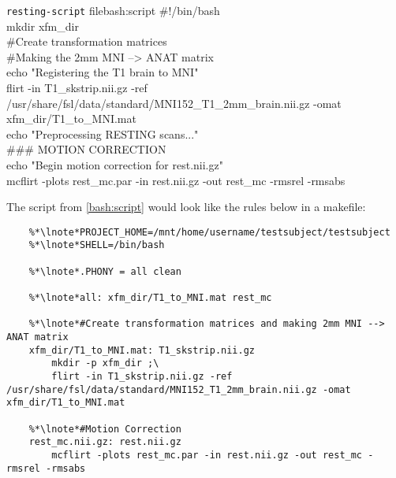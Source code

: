 \begin{bash}{\texttt{resting-script} file}{bash:script}
\#!/bin/bash \\

mkdir xfm_dir \\

\#Create transformation matrices \\

\#Making the 2mm MNI --> ANAT matrix \\
echo "Registering the T1 brain to MNI" \\
flirt -in T1_skstrip.nii.gz -ref /usr/share/fsl/data/standard/MNI152_T1_2mm_brain.nii.gz -omat xfm_dir/T1_to_MNI.mat \\
echo "Preprocessing RESTING scans..." \\

\#\#\# MOTION CORRECTION \\
echo "Begin motion correction for rest.nii.gz" \\
mcflirt -plots rest_mc.par -in rest.nii.gz -out rest_mc -rmsrel -rmsabs 
\end{bash}

\setcounter{codehighlight}{0}
The script from \autoref{bash:script} would look like the rules below in a makefile: %
\begin{lstlisting}
	%*\lnote*PROJECT_HOME=/mnt/home/username/testsubject/testsubject
	%*\lnote*SHELL=/bin/bash
	
	%*\lnote*.PHONY = all clean	
	
	%*\lnote*all: xfm_dir/T1_to_MNI.mat rest_mc

	%*\lnote*#Create transformation matrices and making 2mm MNI --> ANAT matrix
	xfm_dir/T1_to_MNI.mat: T1_skstrip.nii.gz 
		mkdir -p xfm_dir ;\
		flirt -in T1_skstrip.nii.gz -ref /usr/share/fsl/data/standard/MNI152_T1_2mm_brain.nii.gz -omat xfm_dir/T1_to_MNI.mat

	%*\lnote*#Motion Correction
	rest_mc.nii.gz: rest.nii.gz
		mcflirt -plots rest_mc.par -in rest.nii.gz -out rest_mc -rmsrel -rmsabs

	
\end{lstlisting}

